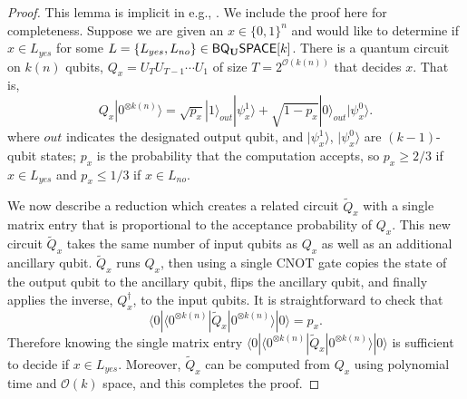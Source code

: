 \documentclass[11pt]{article}
\theoremstyle{definition}
\theoremstyle{remark}
\newcommand{\zero}{\ensuremath{0^{\otimes{k(n)}}}}
\newcommand{\classfont}{\sf}
\newcommand{\Unitary}{\mathbf{U}}
\newcommand{\unitaryBQSPACE}[1]{{\classfont{BQ}_\Unitary\classfont{SPACE}}[#1]}
\begin{document}
\begin{proof}This lemma is implicit in e.g., \cite{bbbv,dawsonnielsen}.  We include the proof here for completeness.  Suppose we are given an $x\in \{0,1\}^n$ and would like to determine if $x\in L_{yes}$ for some $L=\{L_{yes},L_{no}\}\in\unitaryBQSPACE{k}$.  There is a quantum circuit on $k(n)$ qubits, $Q_x=U_TU_{T-1}\cdots U_1$ of size $T=2^{\mathcal{O}(k(n))}$ that decides $x$.  That is, 
\begin{equation}
Q_x|\zero\rangle = \sqrt{p_x} |1\rangle_{out}|\psi_x^1\rangle + \sqrt{1-p_x} |0\rangle_{out} |\psi_x^0\rangle.
\end{equation}
where $out$ indicates the designated output qubit, and $|\psi_x^1\rangle$, $|\psi_x^0\rangle$ are $(k-1)$-qubit states; $p_x$ is the probability that the computation accepts, so $p_x \ge 2/3$ if $x \in L_{yes}$ and $p_x \le 1/3$ if $x \in L_{no}$.

We now describe a reduction which creates a related circuit $\tilde{Q}_x$ with a single matrix entry that is proportional to the acceptance probability of $Q_x$.  This new circuit $\tilde{Q}_x$ takes the same number of input qubits as $Q_x$ as well as an additional ancillary qubit.  $\tilde{Q}_x$ runs $Q_x$, then using a single CNOT gate copies the state of the output qubit to the ancillary qubit, flips the ancillary qubit, and finally applies the inverse, $Q_x^{\dagger}$, to the input qubits. It is straightforward to check that
\begin{equation}
\langle 0|\langle \zero|\tilde{Q}_x|\zero\rangle|0\rangle = p_x.
\end{equation}
Therefore knowing the single matrix entry $\langle 0|\langle \zero|\tilde{Q}_x|\zero\rangle|0\rangle$ is sufficient to decide if $x \in L_{yes}$. Moreover, $\tilde{Q}_x$ can be computed from $Q_x$ using polynomial time and $\mathcal{O}(k)$ space, and this completes the proof.
\end{proof}

 

\end{document}
